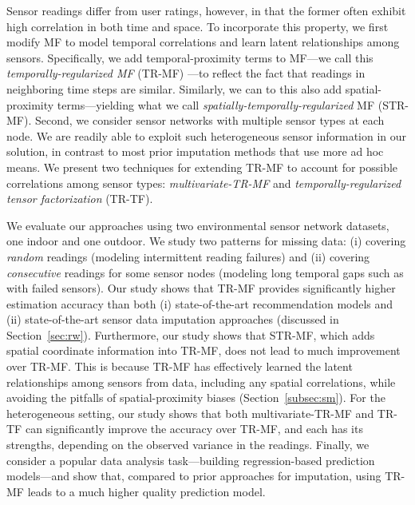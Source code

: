 Sensor readings differ from user ratings, however, in that the former
often exhibit high correlation in both time and space.
To incorporate this property, we first modify MF
to model temporal correlations and learn latent relationships among
sensors.  Specifically, we add temporal-proximity terms to
MF---we call this {\em temporally-regularized MF} (TR-MF)
---to reflect the fact that readings in neighboring time steps are similar.
Similarly, we can to this also add spatial-proximity terms---yielding what we 
call {\em spatially-temporally-regularized} MF (STR-MF).
Second, we consider sensor networks with multiple sensor types at each node.
We are readily able to exploit such heterogeneous sensor information in our
solution, in contrast to most prior imputation methods that use more ad hoc means.
We present two techniques for extending 
TR-MF to account for possible correlations among sensor types: {\em multivariate-TR-MF} and 
{\em temporally-regularized tensor factorization} (TR-TF).

We evaluate our approaches using two environmental sensor network
datasets, one indoor and one outdoor.
We study two patterns for missing data: (i) covering
{\em random} readings (modeling intermittent reading failures) and (ii)
covering {\em consecutive} readings for some sensor nodes
(modeling long temporal gaps such as with failed sensors).
Our study shows that TR-MF provides significantly higher estimation accuracy than 
both (i) state-of-the-art recommendation models and (ii) state-of-the-art sensor data imputation approaches 
(discussed in Section~\ref{sec:rw}).
Furthermore, our study shows that STR-MF, which adds spatial
coordinate information into TR-MF, 
does not lead to much improvement over TR-MF.
This is because TR-MF has effectively learned the latent
relationships among sensors from data, including any spatial correlations, while
avoiding the pitfalls of spatial-proximity biases (Section~\ref{subsec:sm}).
For the heterogeneous setting, our study shows that both
multivariate-TR-MF and TR-TF can significantly improve the accuracy over TR-MF,
and each has its strengths, depending on the observed variance in the
readings.  Finally, we consider a popular data analysis task---building regression-based prediction models---and show that,
compared to prior approaches for imputation, using TR-MF leads to a much higher quality prediction model.

